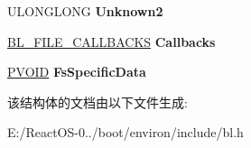 \begin{DoxyCompactItemize}
U\+L\+O\+N\+G\+L\+O\+NG {\bfseries Unknown2}
\item 
\mbox{\label{struct___b_l___f_i_l_e___e_n_t_r_y_a76263c1bc09249cd1b415417738b83ca}} 
\hyperlink{struct___b_l___f_i_l_e___c_a_l_l_b_a_c_k_s}{B\+L\+\_\+\+F\+I\+L\+E\+\_\+\+C\+A\+L\+L\+B\+A\+C\+KS} {\bfseries Callbacks}
\item 
\mbox{\label{struct___b_l___f_i_l_e___e_n_t_r_y_a7a5b3865b932fb0edcae7142facf954e}} 
\hyperlink{interfacevoid}{P\+V\+O\+ID} {\bfseries Fs\+Specific\+Data}
\end{DoxyCompactItemize}


该结构体的文档由以下文件生成\+:\begin{DoxyCompactItemize}
\item 
E\+:/\+React\+O\+S-\/0../boot/environ/include/bl.\+h\end{DoxyCompactItemize}
